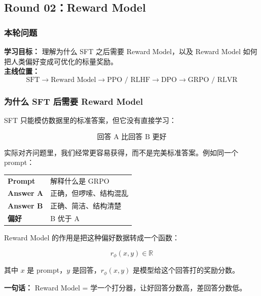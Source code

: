 
\subsection{Round 02：Reward Model}

\subsubsection{本轮问题}

\begin{conceptbox}
\textbf{学习目标：} 理解为什么 SFT 之后需要 Reward Model，以及 Reward Model 如何把人类偏好变成可优化的标量奖励。\\
\textbf{主线位置：}
\[
\text{SFT} \to \text{Reward Model} \to \text{PPO / RLHF} \to \text{DPO} \to \text{GRPO / RLVR}
\]
\end{conceptbox}

\subsubsection{为什么 SFT 后需要 Reward Model}

SFT 只能模仿数据里的标准答案，但它没有直接学习：

\[
\text{回答 A 比回答 B 更好}
\]

实际对齐问题里，我们经常更容易获得，而不是完美标准答案。例如同一个 prompt：

\begin{center}
{\small
\begin{tabular}{p{2.2cm}p{10.8cm}}
\hline
\textbf{Prompt} & 解释什么是 GRPO \\
\textbf{Answer A} & 正确，但啰嗦、结构混乱 \\
\textbf{Answer B} & 正确、简洁、结构清楚 \\
\textbf{偏好} & B 优于 A \\
\hline
\end{tabular}
}
\end{center}

Reward Model 的作用是把这种偏好数据转成一个函数：

\[
r_\phi(x, y) \in \mathbb{R}
\]

其中 $x$ 是 prompt，$y$ 是回答，$r_\phi(x, y)$ 是模型给这个回答打的奖励分数。

\begin{summarybox}
\textbf{一句话：} Reward Model = 学一个打分器，让好回答分数高，差回答分数低。
\end{summarybox}

